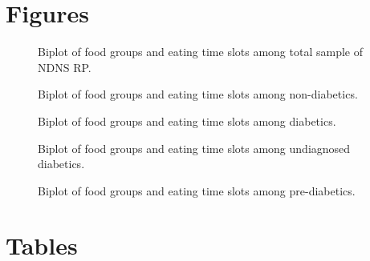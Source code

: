 \documentclass{bmcart}
\def\texttt{[image: ]}
\begin{document}
\begin{backmatter}

\section*{Figures}
  \begin{figure}[h!]
  \caption{Biplot of food groups and eating time slots among total sample of NDNS RP.}
\end{figure}

\begin{figure}[h!]
  \caption{Biplot of food groups and eating time slots among non-diabetics.}
\end{figure}

\begin{figure}[h!]
	\caption{Biplot of food groups and eating time slots among diabetics.}
\end{figure}

\begin{figure}[h!]
	\caption{Biplot of food groups and eating time slots among undiagnosed diabetics.}
\end{figure}


\begin{figure}[h!]
	\caption{Biplot of food groups and eating time slots among pre-diabetics.}
\end{figure}



\section*{Tables}


\end{backmatter}
\end{document}
